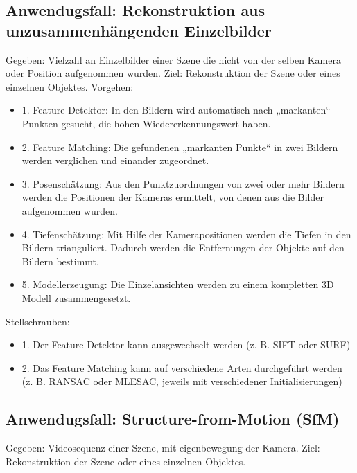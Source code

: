 \subsection{Anwendugsfall: Rekonstruktion aus unzusammenhängenden Einzelbilder}
Gegeben: Vielzahl an Einzelbilder einer Szene die nicht von der selben Kamera oder Position aufgenommen wurden.
Ziel: Rekonstruktion der Szene oder eines einzelnen Objektes.
Vorgehen:
\begin{itemize}
\item 1. Feature Detektor: In den Bildern wird automatisch nach „markanten“ Punkten gesucht, die hohen Wiedererkennungswert haben.\item 2. Feature Matching: Die gefundenen „markanten Punkte“ in zwei Bildern werden verglichen und einander zugeordnet.\item 3. Posenschätzung: Aus den Punktzuordnungen von zwei oder mehr Bildern werden die Positionen der Kameras ermittelt, von denen aus die Bilder aufgenommen wurden.\item 4. Tiefenschätzung: Mit Hilfe der Kamerapositionen werden die Tiefen in den Bildern trianguliert. Dadurch werden die Entfernungen der Objekte auf den Bildern bestimmt.\item 5. Modellerzeugung: Die Einzelansichten werden zu einem kompletten 3D Modell zusammengesetzt.
\end{itemize}
Stellschrauben:
\begin{itemize}
\item 1. Der Feature Detektor kann ausgewechselt werden (z. B. SIFT oder SURF)\item 2. Das Feature Matching kann auf verschiedene Arten durchgeführt werden (z. B. RANSAC oder MLESAC, jeweils mit verschiedener Initialisierungen)
\end{itemize}
\subsection{Anwendugsfall: Structure-from-Motion (SfM)}

Gegeben: Videosequenz einer Szene, mit eigenbewegung der Kamera.
Ziel: Rekonstruktion der Szene oder eines einzelnen Objektes.

